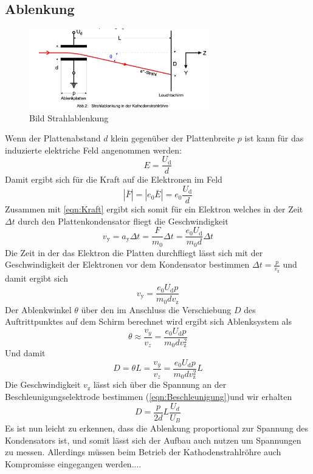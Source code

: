 \subsection{Ablenkung}
\label{sec:Ablenkung}
\begin{figure}[H]
    \centering
    \includegraphics[width=0.7\textwidth]{bilder/Strahlablenkung.png}
    \caption{Bild Strahlablenkung}
    \label{fig:Strahlablenkung}
\end{figure}
Wenn der Plattenabstand $d$ klein gegenüber der Plattenbreite $p$ ist kann für das induzierte elektriche Feld angenommen werden:
\begin{equation*}
    E = \frac{U_{\text{d}}}{d}
\end{equation*}
Damit ergibt sich für die Kraft auf die Elektronen im Feld
\begin{equation}
    |\bar{F}| = |e_0\bar{E}| = e_0 \frac{U_{\text{d}}}{d} \label{eqn:Kraft}
\end{equation}
Zusammen mit \ref{eqn:Kraft} ergibt sich somit für ein Elektron welches in der Zeit $\Delta t$ durch den Plattenkondensator fliegt die Geschwindigkeit
\begin{equation}
    v_{\text{y}} = a_{\text{y}} \Delta t = \frac{F}{m_0}\Delta t = \frac{e_0 U_{\text{d}}}{m_0 d} \Delta t
\end{equation}
Die Zeit in der das Elektron die Platten durchfliegt lässt sich mit der Geschwindigkeit der Elektronen vor dem Kondensator bestimmen $\Delta t = \frac{p}{v_{\text{z}}}$ und damit ergibt sich
\begin{equation}
    v_{\text{y}}  = \frac{e_0 U_{\text{d}} p}{m_0 d v_{\text{z}}} 
\end{equation}
Der Ablenkwinkel $\theta$ über den im Anschluss die Verschiebung $D$ des Auftrittpunktes auf dem Schirm berechnet wird ergibt sich Ablenksystem als 
\begin{equation}
    \theta ≈ \frac{v_y}{v_z} = \frac{e_0 U_{\text{d}} p}{m_0 d v_{\text{z}}^2}
\end{equation}
Und damit
\begin{equation}
    D = \theta L = \frac{v_y}{v_z} = \frac{e_0 U_{\text{d}} p}{m_0 d v_{\text{z}}^2} L
\end{equation}
Die Geschwindigkeit $v_{\text{z}}$ lässt sich über die Spannung an der Beschleunigungselektrode bestimmen (\ref{eqn:Beschleunigung})und wir erhalten
\begin{equation}
    D = \frac{p}{2d}L\frac{U_d}{U_B}
\end{equation}
Es ist nun leicht zu erkennen, dass die Ablenkung proportional zur Spannung des Kondensators ist, und somit lässt sich der Aufbau auch nutzen um Spannungen zu messen.
Allerdings müssen beim Betrieb der Kathodenstrahlröhre auch Kompromisse eingegangen werden.... 
